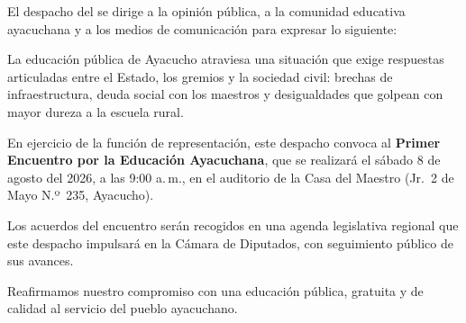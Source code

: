 \documentclass{comunicado}
\begin{document}
\cabeceradocumento


El despacho del   se dirige a la opinión
pública, a la comunidad educativa ayacuchana y a los medios de
comunicación para expresar lo siguiente:

\begin{puntos}
  \item La educación pública de Ayacucho atraviesa una situación que
    exige respuestas articuladas entre el Estado, los gremios y la
    sociedad civil: brechas de infraestructura, deuda social con los
    maestros y desigualdades que golpean con mayor dureza a la
    escuela rural.

  \item En ejercicio de la función de representación, este despacho
    convoca al \textbf{Primer Encuentro por la Educación Ayacuchana},
    que se realizará el sábado 8 de agosto del 2026, a las 9:00 a.\,m.,
    en el auditorio de la Casa del Maestro (Jr.~2 de Mayo N.º~235,
    Ayacucho).

  \item Los acuerdos del encuentro serán recogidos en una agenda
    legislativa regional que este despacho impulsará en la Cámara de
    Diputados, con seguimiento público de sus avances.
\end{puntos}

Reafirmamos nuestro compromiso con una educación pública, gratuita y de
calidad al servicio del pueblo ayacuchano.

\cierrelugarfecha

\end{document}
